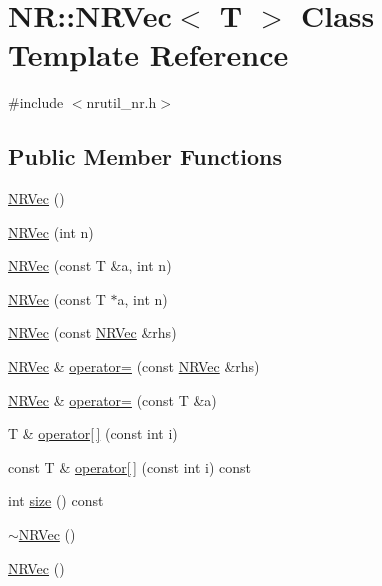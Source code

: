 \hypertarget{classNR_1_1NRVec}{}\section{NR\+:\+:N\+R\+Vec$<$ T $>$ Class Template Reference}
\label{classNR_1_1NRVec}


{\ttfamily \#include $<$nrutil\+\_\+nr.\+h$>$}

\subsection*{Public Member Functions}
\begin{DoxyCompactItemize}
\item 
\mbox{\hyperlink{classNR_1_1NRVec_a3c549533b11738d9c1320abd0078f5aa}{N\+R\+Vec}} ()
\item 
\mbox{\hyperlink{classNR_1_1NRVec_a32e1c3a7b161ae48f90e95f44261c385}{N\+R\+Vec}} (int n)
\item 
\mbox{\hyperlink{classNR_1_1NRVec_a876abf88c99fa23c45098f2f48369ec9}{N\+R\+Vec}} (const T \&a, int n)
\item 
\mbox{\hyperlink{classNR_1_1NRVec_a20980fe6d9976332123225c883fbe67d}{N\+R\+Vec}} (const T $\ast$a, int n)
\item 
\mbox{\hyperlink{classNR_1_1NRVec_a89f4e31b7ca536611076d5ad70f84770}{N\+R\+Vec}} (const \mbox{\hyperlink{classNR_1_1NRVec}{N\+R\+Vec}} \&rhs)
\item 
\mbox{\hyperlink{classNR_1_1NRVec}{N\+R\+Vec}} \& \mbox{\hyperlink{classNR_1_1NRVec_a7a84b82248fd96b304123602029e0ef1}{operator=}} (const \mbox{\hyperlink{classNR_1_1NRVec}{N\+R\+Vec}} \&rhs)
\item 
\mbox{\hyperlink{classNR_1_1NRVec}{N\+R\+Vec}} \& \mbox{\hyperlink{classNR_1_1NRVec_a63573ec64ad29307204ef8cd3377a167}{operator=}} (const T \&a)
\item 
T \& \mbox{\hyperlink{classNR_1_1NRVec_acc741d3714e2d6ce2480dad3ba5d7f08}{operator\mbox{[}$\,$\mbox{]}}} (const int i)
\item 
const T \& \mbox{\hyperlink{classNR_1_1NRVec_adce699639e1489a7b9b95651aa9d9410}{operator\mbox{[}$\,$\mbox{]}}} (const int i) const
\item 
int \mbox{\hyperlink{classNR_1_1NRVec_ab0dfb2d7ce74022fa0ce42138f4a224b}{size}} () const
\item 
\mbox{\hyperlink{classNR_1_1NRVec_a7161dfe4a95a73eca56d084c662f8eae}{$\sim$\+N\+R\+Vec}} ()
\item 
\mbox{\hyperlink{classNR_1_1NRVec_a3c549533b11738d9c1320abd0078f5aa}{N\+R\+Vec}} ()

\end{DoxyCompactItemize}
